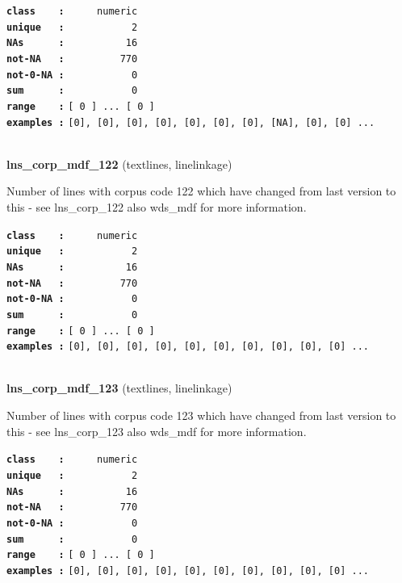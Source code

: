 \documentclass[]{article}
\begin{document}
\textbf{\texttt{class\ \ \ \ :}} \texttt{~~~~~numeric}\\
\textbf{\texttt{unique\ \ \ :}} \texttt{~~~~~~~~~~~2}\\
\textbf{\texttt{NAs\ \ \ \ \ \ :}} \texttt{~~~~~~~~~~16}\\
\textbf{\texttt{not-NA\ \ \ :}} \texttt{~~~~~~~~~770}\\
\textbf{\texttt{not-0-NA\ :}} \texttt{~~~~~~~~~~~0}\\
\textbf{\texttt{sum\ \ \ \ \ \ :}} \texttt{~~~~~~~~~~~0}\\
\textbf{\texttt{range\ \ \ \ :}}
\texttt{{[}\ 0\ {]}\ ...\ {[}\ 0\ {]}}\\
\textbf{\texttt{examples\ :}}
\texttt{{[}0{]},\ {[}0{]},\ {[}0{]},\ {[}0{]},\ {[}0{]},\ {[}0{]},\ {[}0{]},\ {[}NA{]},\ {[}0{]},\ {[}0{]}\ ...}\\

~

\textbf{lns\_corp\_mdf\_122} (textlines, linelinkage)

Number of lines with corpus code 122 which have changed from last
version to this - see lns\_corp\_122 also wds\_mdf for more information.

\textbf{\texttt{class\ \ \ \ :}} \texttt{~~~~~numeric}\\
\textbf{\texttt{unique\ \ \ :}} \texttt{~~~~~~~~~~~2}\\
\textbf{\texttt{NAs\ \ \ \ \ \ :}} \texttt{~~~~~~~~~~16}\\
\textbf{\texttt{not-NA\ \ \ :}} \texttt{~~~~~~~~~770}\\
\textbf{\texttt{not-0-NA\ :}} \texttt{~~~~~~~~~~~0}\\
\textbf{\texttt{sum\ \ \ \ \ \ :}} \texttt{~~~~~~~~~~~0}\\
\textbf{\texttt{range\ \ \ \ :}}
\texttt{{[}\ 0\ {]}\ ...\ {[}\ 0\ {]}}\\
\textbf{\texttt{examples\ :}}
\texttt{{[}0{]},\ {[}0{]},\ {[}0{]},\ {[}0{]},\ {[}0{]},\ {[}0{]},\ {[}0{]},\ {[}0{]},\ {[}0{]},\ {[}0{]}\ ...}\\

~

\textbf{lns\_corp\_mdf\_123} (textlines, linelinkage)

Number of lines with corpus code 123 which have changed from last
version to this - see lns\_corp\_123 also wds\_mdf for more information.

\textbf{\texttt{class\ \ \ \ :}} \texttt{~~~~~numeric}\\
\textbf{\texttt{unique\ \ \ :}} \texttt{~~~~~~~~~~~2}\\
\textbf{\texttt{NAs\ \ \ \ \ \ :}} \texttt{~~~~~~~~~~16}\\
\textbf{\texttt{not-NA\ \ \ :}} \texttt{~~~~~~~~~770}\\
\textbf{\texttt{not-0-NA\ :}} \texttt{~~~~~~~~~~~0}\\
\textbf{\texttt{sum\ \ \ \ \ \ :}} \texttt{~~~~~~~~~~~0}\\
\textbf{\texttt{range\ \ \ \ :}}
\texttt{{[}\ 0\ {]}\ ...\ {[}\ 0\ {]}}\\
\textbf{\texttt{examples\ :}}
\texttt{{[}0{]},\ {[}0{]},\ {[}0{]},\ {[}0{]},\ {[}0{]},\ {[}0{]},\ {[}0{]},\ {[}0{]},\ {[}0{]},\ {[}0{]}\ ...}\\
\end{document}
